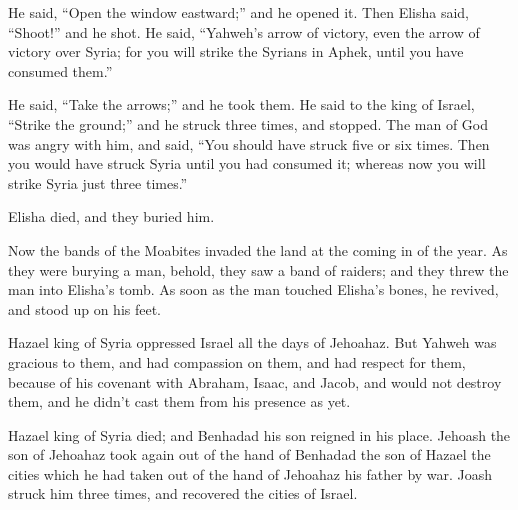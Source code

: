 {He said, “Open the window eastward;” and he opened it. Then Elisha said, “Shoot!” and he shot. He said, “Yahweh’s arrow of victory, even the arrow of victory over Syria; for you will strike the Syrians in Aphek, until you have consumed them.”
\par }{\PP {}He said, “Take the arrows;” and he took them. He said to the king of Israel, “Strike the ground;” and he struck three times, and stopped.
The man of God was angry with him, and said, “You should have struck five or six times. Then you would have struck Syria until you had consumed it; whereas now you will strike Syria just three times.”
\par }{\PP {}Elisha died, and they buried him.
\par }{\PP Now the bands of the Moabites invaded the land at the coming in of the year.
As they were burying a man, behold, they saw a band of raiders; and they threw the man into Elisha’s tomb. As soon as the man touched Elisha’s bones, he revived, and stood up on his feet.
\par }{\PP {}Hazael king of Syria oppressed Israel all the days of Jehoahaz.
But Yahweh was gracious to them, and had compassion on them, and had respect for them, because of his covenant with Abraham, Isaac, and Jacob, and would not destroy them, and he didn’t cast them from his presence as yet.
\par }{\PP {}Hazael king of Syria died; and Benhadad his son reigned in his place.
Jehoash the son of Jehoahaz took again out of the hand of Benhadad the son of Hazael the cities which he had taken out of the hand of Jehoahaz his father by war. Joash struck him three times, and recovered the cities of Israel.

}
